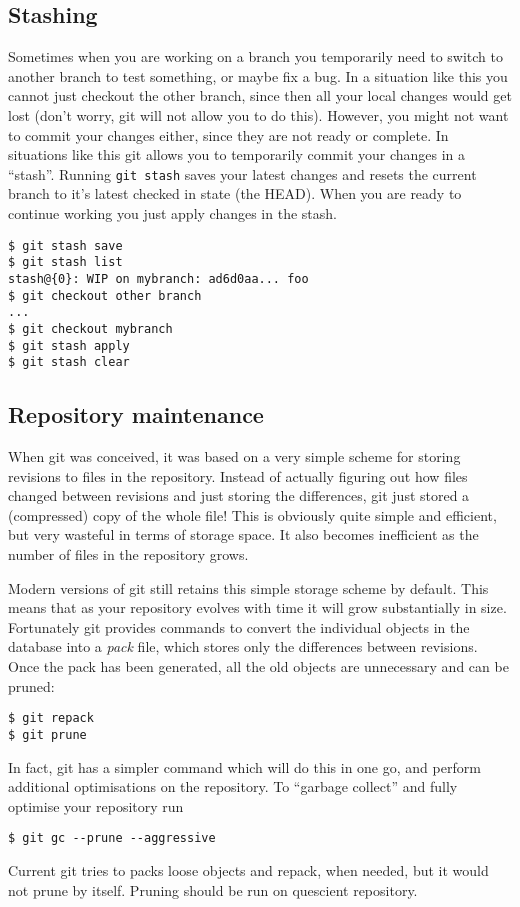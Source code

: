 \documentclass[a4paper,10pt]{article}
\begin{document}
\subsection{Stashing}
Sometimes when you are working on a branch you temporarily need to switch to
another branch to test something, or maybe fix a bug. In a situation like this
you cannot just checkout the other branch, since then all your local changes
would get lost (don't worry, git will not allow you to do this). However, you
might not want to commit your changes either, since they are not ready or
complete. In situations like this git allows you to temporarily commit your
changes in a ``stash''. Running \texttt{git stash} saves your latest changes
and resets the current branch to it's latest checked in state (the HEAD). When
you are ready to continue working you just apply changes in the stash.
\begin{verbatim}
$ git stash save
$ git stash list
stash@{0}: WIP on mybranch: ad6d0aa... foo
$ git checkout other branch
...
$ git checkout mybranch
$ git stash apply
$ git stash clear
\end{verbatim}


\subsection{Repository maintenance}
When git was conceived, it was based on a very simple scheme for storing
revisions to files in the repository. Instead of actually figuring out how
files changed between revisions and just storing the differences, git just
stored a (compressed) copy of the whole file! This is obviously quite simple and efficient,
but very wasteful in terms of storage space. It also becomes inefficient as
the number of files in the repository grows. 

Modern versions of git still retains this simple storage scheme by default.
This means that as your repository evolves with time it will grow
substantially in size. Fortunately git provides commands to convert the
individual objects in the database into a \emph{pack} file, which stores only
the differences between revisions. Once the pack has been generated, all the
old objects are unnecessary and can be pruned:
\begin{verbatim}
$ git repack
$ git prune
\end{verbatim}
In fact, git has a simpler command which will do this in one go, and
perform additional optimisations on the repository. To ``garbage collect'' and
fully optimise your repository run
\begin{verbatim}
$ git gc --prune --aggressive
\end{verbatim}
Current git tries to packs loose objects and repack, when needed, but
it would not prune by itself. Pruning should be run on quescient
repository.
\end{document}
